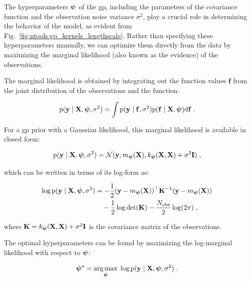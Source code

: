 The hyperparameters $\boldsymbol{\psi}$ of the \gls{gp}, including the parameters of the covariance function and the observation noise variance $\sigma^2$, play a crucial role in determining the behavior of the model, as evident from Fig.~\ref{fig:ntools:gp_kernels_lengthscale}. Rather than specifying these hyperparameters manually, we can optimize them directly from the data by maximizing the marginal likelihood (also known as the evidence) of the observations.

\smallskip
The marginal likelihood is obtained by integrating out the function values $\mathbf{f}$ from the joint distribution of the observations and the function:

\begin{equation}
  \mathrm{p}(\mathbf{y} \mid \mathbf{X}, \boldsymbol{\psi}, \sigma^2) = \int \mathrm{p}(\mathbf{y} \mid \mathbf{f}, \sigma^2) \mathrm{p}(\mathbf{f} \mid \mathbf{X}, \boldsymbol{\psi}) \text{d}\mathbf{f}\;.
\end{equation}

For a \gls{gp} prior with a Gaussian likelihood, this marginal likelihood is available in closed form:

\begin{equation}
  \mathrm{p}(\mathbf{y} \mid \mathbf{X}, \boldsymbol{\psi}, \sigma^2) = \mathcal{N}(\mathbf{y}; m_{\boldsymbol{\psi}}(\mathbf{X}), k_{\boldsymbol{\psi}}(\mathbf{X}, \mathbf{X}) + \sigma^2\mathbf{I})\;,
  \label{eq:marginal_likelihood}
\end{equation}

which can be written in terms of its log-form as:

\begin{equation}
\begin{split}
  \log \mathrm{p}(\mathbf{y} \mid \mathbf{X}, \boldsymbol{\psi}, \sigma^2) & = -\frac{1}{2}(\mathbf{y} - m_{\boldsymbol{\psi}}(\mathbf{X}))^\top\mathbf{K}^{-1}(\mathbf{y} - m_{\boldsymbol{\psi}}(\mathbf{X})) \\
  & \quad - \frac{1}{2}\log\det(\mathbf{K}) - \frac{N_{\mathrm{obs}}}{2}\log(2\pi)\;,
\end{split}
  \label{eq:log_marginal_likelihood}
\end{equation}

where $\mathbf{K} = k_{\boldsymbol{\psi}}(\mathbf{X}, \mathbf{X}) + \sigma^2\mathbf{I}$ is the covariance matrix of the observations.

\smallskip
The optimal hyperparameters can be found by maximizing the log-marginal likelihood with respect to $\boldsymbol{\psi}$:

\begin{equation}
  \boldsymbol{\psi}^\star = \operatorname*{arg\,max}_{\boldsymbol{\psi}}\; \log \mathrm{p}(\mathbf{y} \mid \mathbf{X}, \boldsymbol{\psi}, \sigma^2)\;.
  \label{eq:hyperparameter_optimization}
\end{equation}

